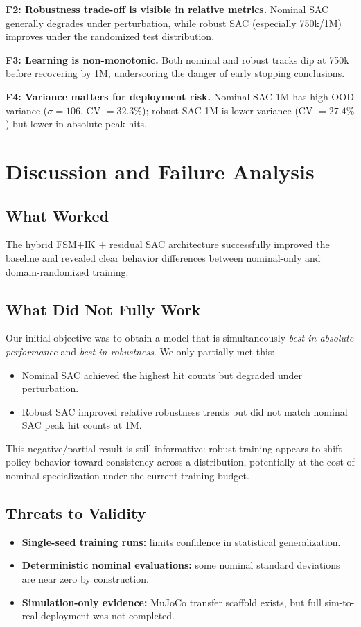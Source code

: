 \documentclass[10pt,twocolumn,letterpaper]{article}
\begin{document}
\textbf{F2: Robustness trade-off is visible in relative metrics.}
Nominal SAC generally degrades under perturbation, while robust SAC (especially 750k/1M) improves under the randomized test distribution.

\textbf{F3: Learning is non-monotonic.}
Both nominal and robust tracks dip at 750k before recovering by 1M, underscoring the danger of early stopping conclusions.

\textbf{F4: Variance matters for deployment risk.}
Nominal SAC 1M has high OOD variance (\(\sigma=106\), CV \(=32.3\%\)); robust SAC 1M is lower-variance (CV \(=27.4\%\)) but lower in absolute peak hits.

\section{Discussion and Failure Analysis}
\subsection{What Worked}
The hybrid FSM+IK + residual SAC architecture successfully improved the baseline and revealed clear behavior differences between nominal-only and domain-randomized training.

\subsection{What Did Not Fully Work}
Our initial objective was to obtain a model that is simultaneously \emph{best in absolute performance} and \emph{best in robustness}. We only partially met this:
\begin{itemize}
    \item Nominal SAC achieved the highest hit counts but degraded under perturbation.
    \item Robust SAC improved relative robustness trends but did not match nominal SAC peak hit counts at 1M.
\end{itemize}
This negative/partial result is still informative: robust training appears to shift policy behavior toward consistency across a distribution, potentially at the cost of nominal specialization under the current training budget.

\subsection{Threats to Validity}
\begin{itemize}
    \item \textbf{Single-seed training runs:} limits confidence in statistical generalization.
    \item \textbf{Deterministic nominal evaluations:} some nominal standard deviations are near zero by construction.
    \item \textbf{Simulation-only evidence:} MuJoCo transfer scaffold exists, but full sim-to-real deployment was not completed.
\end{itemize}
\end{document}
